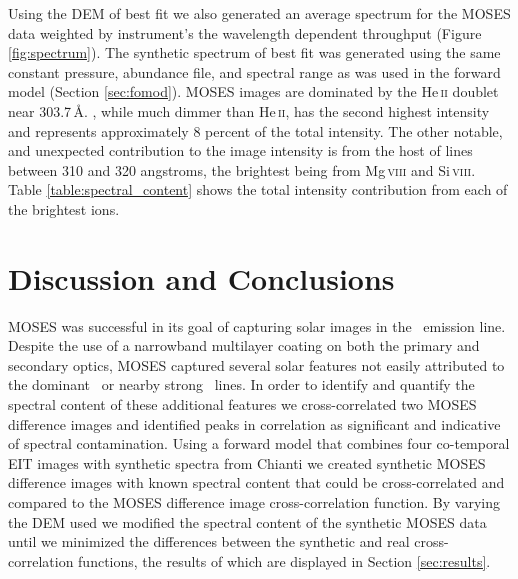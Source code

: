 	
	Using the DEM of best fit we also generated an average spectrum for the MOSES data weighted by instrument's the wavelength dependent throughput (Figure \ref{fig:spectrum}).
	The synthetic spectrum of best fit was generated using the same constant pressure, abundance file, and spectral range as was used in the forward model (Section \ref{sec:fomod}).
	MOSES images are dominated by the He\,\textsc{ii} doublet near 303.7\,\AA.
	\sixi, while much dimmer than He\,\textsc{ii}, has the second highest intensity and represents approximately 8 percent of the total intensity.
	The other notable, and unexpected contribution to the image intensity is from the host of lines between 310 and 320 angstroms, the brightest being from Mg\,\textsc{viii} and Si\,\textsc{viii}.
	Table \ref{table:spectral_content} shows the total intensity contribution from each of the brightest ions.  
	

	
\section{Discussion and Conclusions}\label{sec:conclusion}

	MOSES was successful in its goal of capturing solar images in the \heii \ emission line.
	Despite the use of a narrowband multilayer coating on both the primary and secondary optics, MOSES captured several solar features not easily attributed to the dominant \heii \ or nearby strong \sixi \ lines.
	In order to identify and quantify the spectral content of these additional features we cross-correlated two MOSES difference images and identified peaks in correlation as significant and indicative of spectral contamination.
	Using a forward model that combines four co-temporal EIT images with synthetic spectra from Chianti we created synthetic MOSES difference images with known spectral content that could be cross-correlated and compared to the MOSES difference image cross-correlation function.
	By varying the DEM used we modified the spectral content of the synthetic MOSES data until we minimized the differences between the synthetic and real cross-correlation functions, the results of which are displayed in Section \ref{sec:results}.
	
